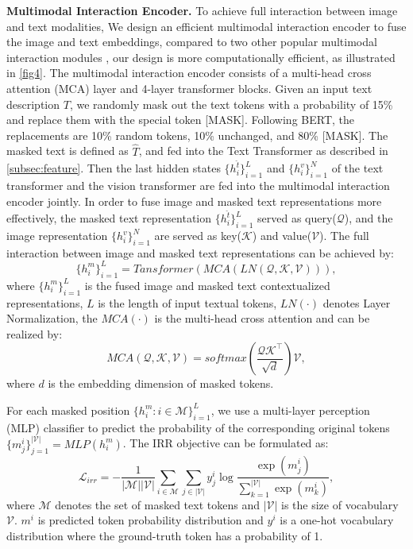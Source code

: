 \documentclass[10pt,twocolumn,letterpaper]{article}
\begin{document}
\textbf{Multimodal Interaction Encoder.}
To achieve full interaction between image and text modalities, We design an efficient multimodal interaction encoder to fuse the image and text embeddings, compared to two other popular multimodal interaction modules \cite{hendricks2021decoupling,dou2022empirical}, our design is more computationally efficient, as illustrated in \cref{fig4}. The multimodal interaction encoder consists of a multi-head cross attention (MCA) layer and 4-layer transformer blocks.
Given an input text description $T$, we randomly mask out the text tokens with a probability of 15\% and replace them with the special token [MASK]. Following BERT, the replacements are 10\% random tokens, 10\% unchanged, and 80\% [MASK]. The masked text is defined as $\hat T$, and fed into the Text Transformer as described in \cref{subsec:feature}. Then the last hidden states $ \{h^{\hat t}_i\}_{i=1}^{L} $ and $ \{h^v_i\}_{i=1}^{N} $ of the text transformer and the vision transformer are fed into the multimodal interaction encoder jointly. In order to fuse image and masked text representations more effectively, the masked text representation $ \{h^{\hat t}_i\}_{i=1}^{L} $ served as query($\mathcal{Q}$), and the image representation $ \{h^v_i\}_{i=1}^{N} $ are served as key($\mathcal{K}$) and value($\mathcal{V} $). The full interaction between image and masked text representations can be achieved by:
\begin{equation}
  \{h^m_i\}_{i=1}^{L} = Tansformer(MCA(LN \mathcal{(Q, K, V)})),
\end{equation}
where $ \{h^m_i\}_{i=1}^{L} $ is the fused image and masked text contextualized representations, $L$ is the length of input textual tokens, $LN(\cdot)$ denotes Layer Normalization, the $MCA(\cdot)$ is the multi-head cross attention and can be realized by:
\begin{equation}
  MCA(\mathcal{Q, K, V}) = softmax(\frac{\mathcal{QK}^\top}{\sqrt{d}})\mathcal{V},
\end{equation}
where $d$ is the embedding dimension of masked tokens. 

For each masked position $\{h^m_i:i \in \mathcal{M}\}_{i=1}^{L}$, we use a multi-layer perception (MLP) classifier to predict the probability of the corresponding original tokens $ \{m_j^i\}_{j=1}^{\mathcal{|V|}}=MLP(h^m_i) $. The IRR objective can be formulated as:
\begin{equation}
  \mathcal{L}_{irr} =-\frac{1}{|\mathcal{M}| |\mathcal{V}|} \sum_{i \in \mathcal{M}} \sum_{j \in |\mathcal{V}|} y_j^i
  \log \frac{\exp (m_j^i) }{\sum_{k=1}^{|\mathcal{V}|} \exp (m_k^i)},
\end{equation}
where $\mathcal{M}$ denotes the set of masked text tokens and $\mathcal{|V|}$ is the size of vocabulary $\mathcal{V}$. $m^i$ is predicted token probability distribution and $y^i$ is a one-hot vocabulary distribution where the ground-truth token has a probability of 1.
\end{document}
